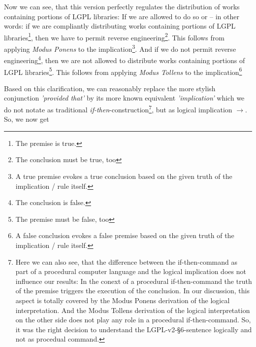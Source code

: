 Now we can see, that this version perfectly regulates the distribution of works
containing portions of LGPL libraries: If we are allowed to do so or -- in other
words: if we are compliantly distributing works containing portions of LGPL
libraries\footnote{The premise is true.}, then we have to permit reverse
engineering\footnote{The conclusion must be true, too}. This follows from
applying \emph{Modus Ponens} to the implication\footnote{A true premise evokes a
true conclusion based on the given truth of the implication / rule itself.}. And
if we do not permit reverse engineering\footnote{The conclusion is false.}, then
we are not allowed to distribute works containing portions of LGPL
libraries\footnote{The premise must be false, too}. This follows from applying
\emph{Modus Tollens} to the implication\footnote{A false conclusion evokes a
false premise based on the given truth of the implication / rule itself.}

Based on this clarification, we can reasonably replace the more stylish
conjunction \emph{'provided that'} by its more known equivalent
\emph{'implication'} which we do not notate as traditional
\emph{if-then}-construction\footnote{Here we can also see, that the difference
between the if-then-command as part of a procedural computer language and the
logical implication does not influence our results: In the conext of a
procedural if-then-command the truth of the premise triggers the execution of
the conclusion. In our discussion, this aspect is totally covered by the Modus
Ponens derivation of the logical interpretation. And the Modus Tollens
derivation of the logical interpretation on the other side does not play any
role in a procedural if-then-command. So, it was the right decision to
understand the LGPL-v2-§6-sentence logically and not as procedual command.}, but
as logical implication \emph{$\rightarrow$}. So, we now get

